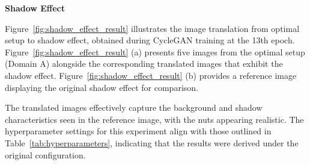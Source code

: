 \documentclass[12pt,DIV14,BCOR12mm,a4paper,footinclude=false,headinclude,parskip=half-,twoside,openright,cleardoublepage=empty,toc=index,bibliography=totoc,listof=totoc]{scrreprt}
\numberwithin{equation}{chapter}
\begin{document}
\textbf{Shadow Effect}

Figure~\ref{fig:shadow_effect_result} illustrates the image translation from optimal setup to shadow effect, obtained during CycleGAN training at the 13th epoch. Figure~\ref{fig:shadow_effect_result} (a) presents five images from the optimal setup (Domain A) alongside the corresponding translated images that exhibit the shadow effect. Figure~\ref{fig:shadow_effect_result} (b) provides a reference image displaying the original shadow effect for comparison.

The translated images effectively capture the background and shadow characteristics seen in the reference image, with the nuts appearing realistic. The hyperparameter settings for this experiment align with those outlined in Table~\ref{tab:hyperparameters}, indicating that the results were derived under the original configuration.
\end{document}

